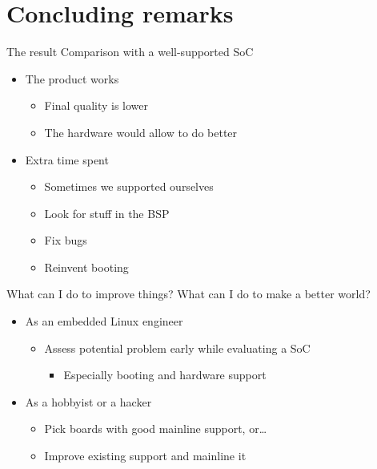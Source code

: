 \documentclass[xetex,table]{beamer}
\begin{document}
\section{Concluding remarks}

\begin{frame}{The result}
  Comparison with a well-supported SoC
  \begin{itemize}
  \item The product works
    \begin{itemize}
    \item Final quality is lower
    \item The hardware would allow to do better
    \end{itemize}
  \item Extra time spent
    \begin{itemize}
    \item Sometimes we supported ourselves
    \item Look for stuff in the BSP
    \item Fix bugs
    \item Reinvent booting
    \end{itemize}
  \end{itemize}
\end{frame}

\begin{frame}{What can I do to improve things?}
  What can I do to make a better world?
  \begin{itemize}
  \item As an embedded Linux engineer
    \begin{itemize}
    \item Assess potential problem early while evaluating a SoC
      \begin{itemize}
      \item Especially booting and hardware support
      \end{itemize}
    \end{itemize}
  \item As a hobbyist or a hacker
    \begin{itemize}
    \item Pick boards with good mainline support, or\dots
    \item Improve existing support and mainline it
    \end{itemize}
  \end{itemize}
\end{frame}
\end{document}
